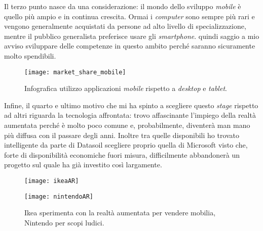 Il terzo punto nasce da una considerazione: il mondo dello sviluppo \textit{mobile} è quello più ampio e in continua crescita. Ormai i \textit{computer} sono sempre più rari e vengono generalmente acquistati da persone ad alto livello di specializzazione, mentre il pubblico generalista preferisce usare gli \textit{smartphone}. \e{} quindi saggio a mio avviso sviluppare delle competenze in questo ambito perché saranno sicuramente molto spendibili.
\begin{figure}[H]
    \centering
    \texttt{[image: market\_share\_mobile]}
    \caption[\textit{Market share} \textit{desktop} e \textit{mobile}]{Infografica utilizzo applicazioni \textit{mobile} rispetto a \textit{desktop} e \textit{tablet}.\footnotemark}
\end{figure}
Infine, il quarto e ultimo motivo che mi ha spinto a scegliere questo \textit{stage} rispetto ad altri riguarda la tecnologia affrontata: trovo affascinante l'impiego della realtà aumentata perché è molto poco comune e, probabilmente, diventerà man mano più diffusa con il passare degli anni. Inoltre tra quelle disponibili ho trovato intelligente da parte di Datasoil scegliere proprio quella di Microsoft visto che, forte di disponibilità economiche fuori misura, difficilmente abbandonerà un progetto sul quale ha già investito così largamente.
\begin{figure}[H]
    \centering
    \begin{minipage}{.5\textwidth}
      \centering
      \texttt{[image: ikeaAR]}
      \label{fig:test1}
    \end{minipage}%
    \begin{minipage}{.5\textwidth}
      \centering
      \texttt{[image: nintendoAR]}
    \end{minipage}
    \caption[Ikea e Nintendo usano realtà aumentata]{Ikea sperimenta con la realtà aumentata per vendere mobilia, Nintendo per scopi ludici.\footnotemark}
\end{figure}

